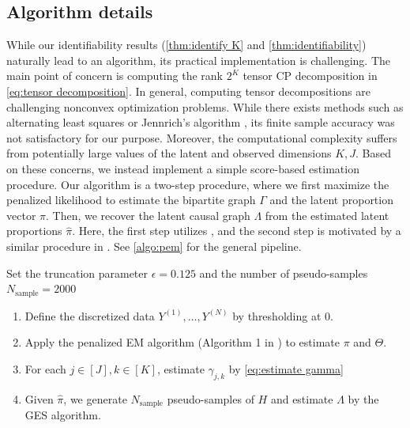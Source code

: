 \documentclass[10pt]{article} %
\def\hat{\widehat}
\begin{document}
\subsection{Algorithm details}\label{subsec:algo}
While our identifiability results (\cref{thm:identify K} and \cref{thm:identifiability}) naturally lead to an algorithm, its practical implementation is challenging. The main point of concern is computing the rank $2^K$ tensor CP decomposition in \eqref{eq:tensor decomposition}. In general, computing tensor decompositions are challenging nonconvex optimization problems. While there exists methods such as alternating least squares or Jennrich's algorithm \citep{kolda2009tensor, harshman1970foundations}, its finite sample accuracy was not satisfactory for our purpose. Moreover, the computational complexity suffers from potentially large values of the latent and observed dimensions $K, J$. Based on these concerns, we instead implement a simple score-based estimation procedure. {Our algorithm is a two-step procedure, where we first maximize the penalized likelihood to estimate the bipartite graph $\Gamma$ and the latent proportion vector $\pi$. Then, we recover the latent causal graph $\Lambda$ from the estimated latent proportions $\hat{\pi}$. 
Here, the first step utilizes \cite{ma2023learning}, and the second step is motivated by a similar procedure in \cite{zhang2025causalrep}.
} See \cref{algo:pem} for the general pipeline.
%

\begin{algorithm}
\caption{Full algorithm to learn the model components.}
\label{algo:pem}

Set the truncation parameter $\epsilon = 0.125$ and the number of pseudo-samples $N_{\text{sample}} = 2000$
\begin{enumerate}
    \item Define the discretized data $Y^{(1)},\ldots,Y^{(N)}$ by thresholding  at $0$.
    \item Apply the penalized EM algorithm (Algorithm 1 in \cite{ma2023learning}) to estimate ${\pi}$ and ${\Theta}$.
    \item For each $j \in [J], k \in [K]$, estimate $\gamma_{j,k}$ by \eqref{eq:estimate gamma}
    \item Given $\hat{\pi}$, we generate $N_{\text{sample}}$ pseudo-samples of $H$ and estimate $\Lambda$ by the GES algorithm.
\end{enumerate}
\end{algorithm}
\end{document}
